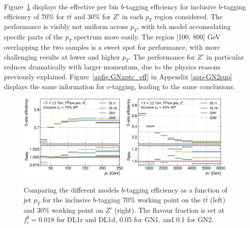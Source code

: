 Figure~\ref{fig:GNxptb_eff} displays the effective per bin $b$-tagging efficiency for inclusive $b$-tagging efficiency of 70\% for $t\bar{t}$ and 30\% for $Z'$ in each $p_T$ region considered. The performance is visibly not uniform across $p_T$, with teh model accomodating specific parts of the $p_T$ spectrum more easily. The region [100, 800] GeV overlapping the two samples is a sweet spot for performance, with more challenging results at lower and higher $p_T$. The performance for $Z'$ in particular reduces dramatically with larger momentum, due to the physics reasons previously explained. Figure~\ref{apfig:GNxptc_eff} in Appendix \ref{app-GN2sup} displays the same information for $c$-tagging, leading to the same conclusions. 
\begin{figure}[h!]
  \centering
  \includegraphics[width=0.48\textwidth]{Images/FTAG/GN/GN2/pt_plots/pt_ttbar_b_eff.png}
  \includegraphics[width=0.48\textwidth]{Images/FTAG/GN/GN2/pt_plots/pt_zp_b_eff.png}
  \caption{Comparing the different models $b$-tagging efficiency as a function of jet $p_T$ for the inclusive $b$-tagging 70\% working point on the $t\bar{t}$ (left) and 30\% working point on $Z'$ (right). The flavour fraction is set at $f^b_c = 0.018$ for DL1r and DL1d, 0.05 for GN1, and 0.1 for GN2.}
  \label{fig:GNxptb_eff}
\end{figure} 

